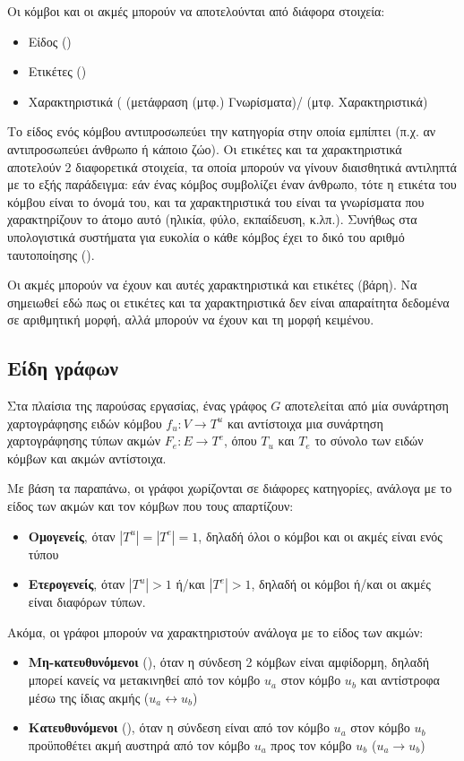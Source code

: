 Οι κόμβοι και οι ακμές μπορούν να αποτελούνται από διάφορα στοιχεία:
\begin{itemize}
    \item Είδος ()
    \item Ετικέτες ()
    \item Χαρακτηριστικά ( (μετάφραση (μτφ.) Γνωρίσματα)/ (μτφ. Χαρακτηριστικά)
\end{itemize}

Το είδος ενός κόμβου αντιπροσωπεύει την κατηγορία στην οποία εμπίπτει (π.χ. αν αντιπροσωπεύει
άνθρωπο ή κάποιο ζώο). Οι ετικέτες και τα χαρακτηριστικά αποτελούν 2 διαφορετικά στοιχεία,
τα οποία μπορούν να γίνουν διαισθητικά αντιληπτά με το εξής παράδειγμα: εάν ένας κόμβος
συμβολίζει έναν άνθρωπο, τότε η ετικέτα του κόμβου είναι το όνομά του, και τα χαρακτηριστικά
του είναι τα γνωρίσματα που χαρακτηρίζουν το άτομο αυτό (ηλικία, φύλο, εκπαίδευση, κ.λπ.).
Συνήθως στα υπολογιστικά συστήματα για ευκολία ο κάθε κόμβος έχει το δικό του αριθμό
ταυτοποίησης ().

Οι ακμές μπορούν να έχουν και αυτές χαρακτηριστικά και ετικέτες (βάρη). Να σημειωθεί εδώ πως
οι ετικέτες και τα χαρακτηριστικά δεν είναι απαραίτητα δεδομένα σε αριθμητική μορφή, αλλά
μπορούν να έχουν και τη μορφή κειμένου.

\subsection{Είδη γράφων} \label{Είδη γράφων}

Στα πλαίσια της παρούσας εργασίας, ένας γράφος \(G\) αποτελείται από μία συνάρτηση χαρτογράφησης ειδών κόμβου \(f_u: V 
\rightarrow T^u\) και αντίστοιχα μια συνάρτηση χαρτογράφησης τύπων ακμών \(F_e: E \rightarrow
T^e\), όπου \(T_u\) και \(T_e\) το σύνολο των ειδών κόμβων και ακμών αντίστοιχα. 

Με βάση τα παραπάνω, οι γράφοι χωρίζονται σε διάφορες κατηγορίες, ανάλογα με το είδος των ακμών και τον κόμβων που τους απαρτίζουν:
\begin{itemize}
    \item \textbf{Ομογενείς}, όταν \(|T^u| = |T^e| = 1\), δηλαδή όλοι ο κόμβοι και οι ακμές 
    είναι ενός τύπου
    \item \textbf{Ετερογενείς}, όταν \(|T^u|>1\) ή/και \(|T^e|>1\), δηλαδή οι κόμβοι ή/και 
    οι ακμές είναι διαφόρων τύπων.
\end{itemize}

Ακόμα, οι γράφοι μπορούν να χαρακτηριστούν ανάλογα με το είδος των ακμών:
\begin{itemize}
    \item \textbf{Μη-κατευθυνόμενοι} (), όταν η σύνδεση 2 κόμβων είναι
    αμφίδορμη, δηλαδή μπορεί κανείς να μετακινηθεί από τον κόμβο \(u_a\) στον κόμβο \(u_b\)
    και αντίστροφα μέσω της ίδιας ακμής (\(u_a \leftrightarrow u_b\))
    \item \textbf{Κατευθυνόμενοι} (), όταν η σύνδεση είναι από τον κόμβο \(u_a\)
    στον κόμβο \(u_b\) προϋποθέτει ακμή αυστηρά από τον κόμβο \(u_a\) προς τον κόμβο \(u_b\)
    (\(u_a \rightarrow u_b\))
\end{itemize}

